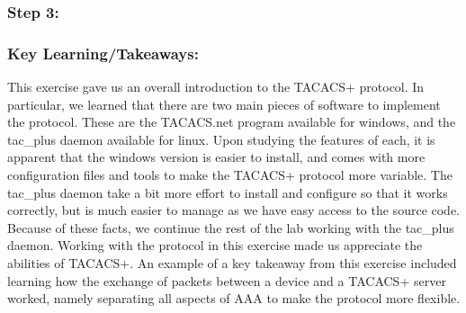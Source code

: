 \documentclass[main.tex]{subfiles}
\begin{document}
\subsubsection{Step 3:}
\hfill \break


\subsubsection{Key Learning/Takeaways:}
This exercise gave us an overall introduction to the TACACS+ protocol. In particular, we learned that there are two main pieces of software to implement the protocol. These are the TACACS.net program available for windows, and the tac\_plus daemon available for linux. Upon studying the features of each, it is apparent that the windows version is easier to install, and comes with more configuration files and tools to make the TACACS+ protocol more variable. The tac\_plus daemon take a bit more effort to install and configure so that it works correctly, but is much easier to manage as we have easy access to the source code. Because of these facts, we continue the rest of the lab working with the tac\_plus daemon. Working with the protocol in this exercise made us appreciate the abilities of TACACS+. An example of a key takeaway from this exercise included learning how the exchange of packets between a device and a TACACS+ server worked, namely separating all aspects of AAA to make the protocol more flexible.
\end{document}
